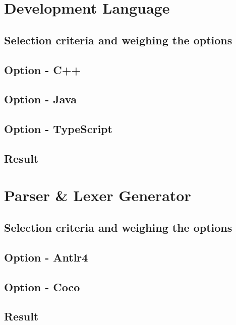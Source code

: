 \section{Development Language}

\subsection{Selection criteria and weighing the options}

\subsection{Option - C++}

\subsection{Option - Java}

\subsection{Option - TypeScript}

\subsection{Result}

\section{Parser \& Lexer Generator}

\subsection{Selection criteria and weighing the options}

\subsection{Option - Antlr4}

\subsection{Option - Coco}

\subsection{Result}
